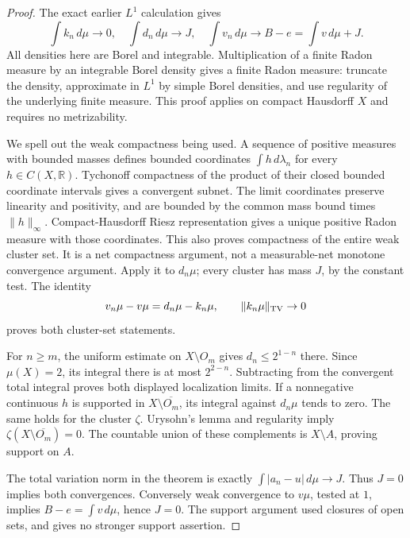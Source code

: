\begin{proof}
The exact earlier $L^1$ calculation gives
\[
 \int k_n\,d\mu\to0,\quad \int d_n\,d\mu\to J,
 \quad \int v_n\,d\mu\to B-e=\int v\,d\mu+J.
\]
All densities here are Borel and integrable. Multiplication of a finite
Radon measure by an integrable Borel density gives a finite Radon measure:
truncate the density, approximate in $L^1$ by simple Borel densities,
and use regularity of the underlying finite measure. This proof applies
on compact Hausdorff $X$ and requires no metrizability.

We spell out the weak compactness being used. A sequence of positive
measures with bounded masses defines bounded coordinates
$\int h\,d\lambda_n$ for every $h\in C(X,\mathbb R)$. Tychonoff
compactness of the product of their closed bounded coordinate intervals
gives a convergent subnet. The limit coordinates preserve linearity and
positivity, and are bounded by the common mass bound times
$\|h\|_\infty$. Compact-Hausdorff Riesz representation gives a unique
positive Radon measure with those coordinates. This also proves
compactness of the entire weak cluster set. It is a net compactness
argument, not a measurable-net monotone convergence argument.
Apply it to $d_n\mu$; every cluster has mass $J$, by the constant test.
The identity
\[
 v_n\mu-v\mu=d_n\mu-k_n\mu,
 \qquad\|k_n\mu\|_{\rm TV}\to0
\]
proves both cluster-set statements.

For $n\ge m$, the uniform estimate on $X\setminus O_m$ gives
$d_n\le 2^{1-n}$ there. Since $\mu(X)=2$, its integral there is
at most $2^{2-n}$. Subtracting from the convergent total integral proves
both displayed localization limits. If a nonnegative continuous $h$ is
supported in $X\setminus\overline{O_m}$, its integral against
$d_n\mu$ tends to zero. The same holds for the cluster $\zeta$.
Urysohn's lemma and regularity imply
$\zeta(X\setminus\overline{O_m})=0$. The countable union of these
complements is $X\setminus A$, proving support on $A$.

The total variation norm in the theorem is exactly
$\int|a_n-u|\,d\mu\to J$. Thus $J=0$ implies both convergences.
Conversely weak convergence to $v\mu$, tested at $1$, implies
$B-e=\int v\,d\mu$, hence $J=0$. The support argument used closures
of open sets, and gives no stronger support assertion.
\end{proof}

